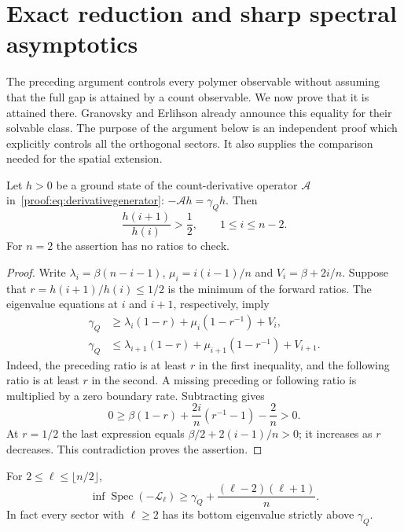 \section{Exact reduction and sharp spectral asymptotics}
\label{sec:exact-spectrum}

The preceding argument controls every polymer observable without assuming
that the full gap is attained by a count observable. We now prove that it
is attained there. Granovsky and Erlihson
\cite[Section~2.3]{GranovskyErlihson2009} already announce this equality
for their solvable class. The purpose of the argument below is an
independent proof which explicitly controls all the orthogonal sectors.
It also supplies the comparison needed for the spatial extension.

\begin{lemma}\label{lem:ground-ratio}
Let $h>0$ be a ground state of the count-derivative operator
$\mathcal A$ in~\eqref{proof:eq:derivativegenerator}:
$-\mathcal Ah=\gamma_Qh$. Then
\[
 \frac{h(i+1)}{h(i)}>\frac12,\qquad 1\le i\le n-2.
\]
For $n=2$ the assertion has no ratios to check.
\end{lemma}

\begin{proof}
Write $\lambda_i=\beta(n-i-1)$, $\mu_i=i(i-1)/n$ and
$V_i=\beta+2i/n$. Suppose that $r=h(i+1)/h(i)\le1/2$ is the
minimum of the forward ratios. The eigenvalue equations at $i$ and
$i+1$, respectively, imply
\begin{align*}
 \gamma_Q&\ge\lambda_i(1-r)+\mu_i(1-r^{-1})+V_i,\\
 \gamma_Q&\le\lambda_{i+1}(1-r)+\mu_{i+1}(1-r^{-1})+V_{i+1}.
\end{align*}
Indeed, the preceding ratio is at least $r$ in the first inequality,
and the following ratio is at least $r$ in the second. A missing
preceding or following ratio is multiplied by a zero boundary rate.
Subtracting gives
\[
 0\ge\beta(1-r)+\frac{2i}{n}(r^{-1}-1)-\frac2n>0.
\]
At $r=1/2$ the last expression equals $\beta/2+2(i-1)/n>0$;
it increases as $r$ decreases. This contradiction
proves the assertion.
\end{proof}

\begin{proposition}
\label{prop:higher-exact}
For $2\le\ell\le\lfloor n/2\rfloor$,
\[
 \inf\operatorname{Spec}(-\mathcal L_\ell)
 \ge\gamma_Q+\frac{(\ell-2)(\ell+1)}n.
\]
In fact every sector with $\ell\ge2$ has its bottom eigenvalue
strictly above $\gamma_Q$.
\end{proposition}


